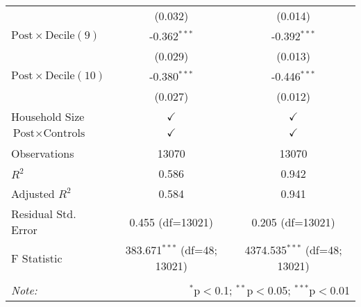 \begin{tabular}{@{\extracolsep{5pt}}lcc}
& (0.032) & (0.014) \\
 $\text{Post} \times \text{Decile}(9)$ & -0.362$^{***}$ & -0.392$^{***}$ \\
& (0.029) & (0.013) \\
 $\text{Post} \times \text{Decile}(10)$ & -0.380$^{***}$ & -0.446$^{***}$ \\
& (0.027) & (0.012) \\
 Household Size & $\checkmark$ & $\checkmark$ \\
 $\text{Post} \times \text{Controls}$ & $\checkmark$ & $\checkmark$ \\
\hline \\[-1.8ex]
 Observations & 13070 & 13070 \\
 $R^2$ & 0.586 & 0.942 \\
 Adjusted $R^2$ & 0.584 & 0.941 \\
 Residual Std. Error & 0.455 (df=13021) & 0.205 (df=13021) \\
 F Statistic & 383.671$^{***}$ (df=48; 13021) & 4374.535$^{***}$ (df=48; 13021) \\
\hline
\hline \\[-1.8ex]
\textit{Note:} & \multicolumn{2}{r}{$^{*}$p$<$0.1; $^{**}$p$<$0.05; $^{***}$p$<$0.01} \\
\end{tabular}